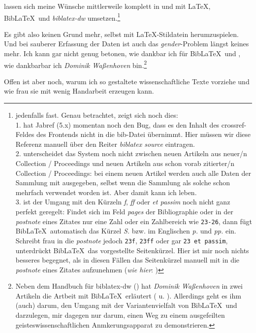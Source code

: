  lassen sich meine Wünsche mittlerweile komplett in und mit \LaTeX, Bib\LaTeX\ und \emph{biblatex-dw} umsetzen.\footnote{jedenfalls fast. Genau betrachtet, zeigt sich noch dies: \\
1. hat Jabref (5.x) momentan noch den Bug, dass es den Inhalt des crossref-Feldes des Frontends nicht in die bib-Datei übernimmt. Hier müssen wir diese Referenz manuell über den Reiter \emph{biblatex source} eintragen.\\
2. unterscheidet das System noch nicht zwischen neuen Artikeln aus neuer/n Collection / Proceedings und neuen Artikeln aus schon vorab zitierter/n Collection / Proceedings: bei einem neuen Artikel werden auch alle Daten der Sammlung mit ausgegeben, selbst wenn die Sammlung als solche schon mehrfach verwendet worden ist. Aber damit kann ich leben.\\
3. ist der Umgang mit den Kürzeln \emph{f}, \emph{ff} oder \emph{et passim} noch nicht ganz perfekt geregelt: Findet sich im Feld \emph{pages} der Bibliographie oder in der \emph{postnote} eines Zitates nur eine Zahl oder ein Zahlbereich wie \texttt{23-26}, dann fügt Bib\LaTeX\ automatisch das Kürzel \emph{S.} bzw. im Englischen \emph{p.} und  \emph{pp.} ein. Schreibt frau in die \emph{postnote} jedoch  \texttt{23f}, \texttt{23ff} oder gar \texttt{23 et passim}, unterdrückt  Bib\LaTeX\ das vorgestellte Seitenkürzel. Hier ist mir noch nichts besseres begegnet, als in diesen Fällen das Seitenkürzel manuell mit in die \emph{postnote} eines Zitates aufzunehmen (\emph{wie hier}: \cite[vgl.][S. 50f et passim]{Lewin1992a})
}

Es gibt also keinen Grund mehr, selbst mit \LaTeX-Stildatein herumzuspielen. Und bei sauberer Erfassung der Daten ist auch das \emph{gender}-Problem längst keines mehr. Ich kann gar nicht genug betonen, wie dankbar ich für Bib\LaTeX\ und , wie dankbarbar ich  \emph{Dominik Waßenhoven} bin.\footnote{Neben dem Handbuch für {biblatex-dw} (\cite[vgl.][]{Waßenhoven2016a}) hat \emph{Dominik Waßenhoven} in zwei Artikeln die Artbeit mit Bib\LaTeX\ erläutert (\cite[vgl.][]{Waßenhoven2008a} u. \cite[vgl.][]{Waßenhoven2008b}). Allerdings geht es ihm (auch) darum, den Umgang mit der Variantenvielfalt von Bib\LaTeX\ und  darzulegen, mir dagegen nur darum, einen Weg zu einem ausgefeilten geisteswissenschaftlichen Anmkerungsapparat zu demonstrieren.}

Offen ist aber noch, warum ich so gestaltete wissenschaftliche Texte vorziehe und wie frau sie mit wenig Handarbeit erzeugen kann.



%
